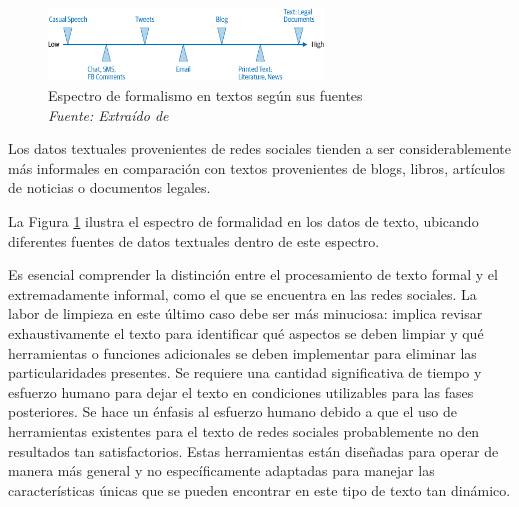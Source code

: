\begin{figure}[h!]
	\includegraphics[width=0.65\textwidth]{capitulo3/figuras/nlp7.png}
	\caption{Espectro de formalismo en textos según sus fuentes
		\\\textit{Fuente: Extraído de} \protect\cite[p. 283]{vajjala2020practical} }
	\label{fig:nlp7}
\end{figure}

Los datos textuales provenientes de redes sociales tienden a ser considerablemente más informales en comparación con textos provenientes de blogs, libros, artículos de noticias o documentos legales.

 La Figura \ref{fig:nlp7} ilustra el espectro de formalidad en los datos de texto, ubicando diferentes fuentes de datos textuales dentro de este espectro.



Es esencial comprender la distinción entre el procesamiento de texto formal y el extremadamente informal, como el que se encuentra en las redes sociales. La labor de limpieza en este último caso debe ser más minuciosa: implica revisar exhaustivamente el texto para identificar qué aspectos se deben limpiar y qué herramientas o funciones adicionales se deben implementar para eliminar las particularidades presentes. Se requiere una cantidad significativa de tiempo y esfuerzo humano para dejar el texto en condiciones utilizables para las fases posteriores. Se hace un énfasis al esfuerzo humano debido a que el uso de herramientas existentes para el texto de redes sociales probablemente no den resultados tan satisfactorios. Estas herramientas están diseñadas para operar de manera más general y no específicamente adaptadas para manejar las características únicas que se pueden encontrar en este tipo de texto tan dinámico.